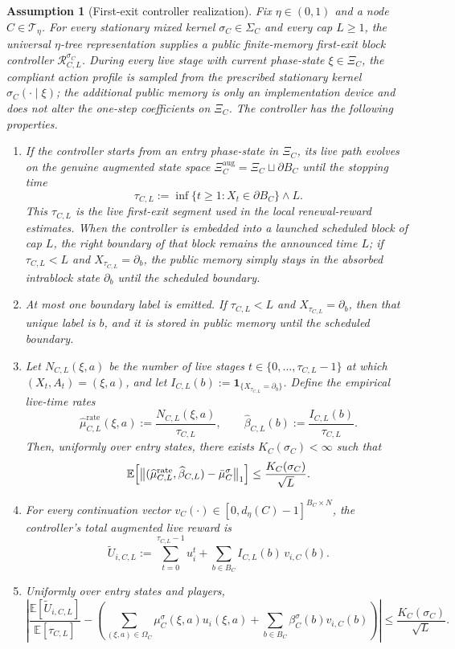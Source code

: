 \documentclass[12pt]{article}
\newtheorem{assumption}[theorem]{Assumption}
\theoremstyle{definition}
\newcommand{\E}{\mathbb{E}}
\newcommand{\1}{\mathbf{1}}
\newcommand{\cT}{\mathcal{T}}
\begin{document}
\begin{assumption}[First-exit controller realization]
\label{ass:controller-input}
Fix $\eta\in(0,1)$ and a node $C\in\cT_\eta$. For every stationary mixed kernel
$\sigma_C\in\Sigma_C$ and every cap $L\ge 1$, the universal
$\eta$-tree representation supplies a public finite-memory first-exit block
controller $\mathcal R_{C,L}^{\sigma_C}$. During every live stage with current
phase-state $\xi\in\Xi_C$, the compliant action profile is sampled from the
prescribed stationary kernel $\sigma_C(\cdot\mid\xi)$; the additional public
memory is only an implementation device and does not alter the one-step
coefficients on $\Xi_C$. The controller has the following properties.
\begin{enumerate}[label=\textnormal{(R\arabic*)},leftmargin=2.8em]
\item If the controller starts from an entry phase-state in $\Xi_C$, its live
path evolves on the genuine augmented state space
$\Xi_C^{\mathrm{aug}}=\Xi_C\sqcup\partial B_C$ until the stopping time
\[
\tau_{C,L}
:=
\inf\{t\ge 1:X_t\in\partial B_C\}\wedge L.
\]
This $\tau_{C,L}$ is the live first-exit segment used in the local
renewal-reward estimates. When the controller is embedded into a launched
scheduled block of cap $L$, the right boundary of that block remains the
announced time $L$; if $\tau_{C,L}<L$ and $X_{\tau_{C,L}}=\partial_b$, the public
memory simply stays in the absorbed intrablock state $\partial_b$ until the
scheduled boundary.
\item At most one boundary label is emitted. If $\tau_{C,L}<L$ and
$X_{\tau_{C,L}}=\partial_b$, then that unique label is $b$, and it is stored in
public memory until the scheduled boundary.
\item Let $N_{C,L}(\xi,a)$ be the number of live stages
$t\in\{0,\dots,\tau_{C,L}-1\}$ at which $(X_t,A_t)=(\xi,a)$, and let
$I_{C,L}(b):=\1_{\{X_{\tau_{C,L}}=\partial_b\}}$. Define the empirical live-time
rates
\[
\widehat\mu_{C,L}^{\mathrm{rate}}(\xi,a):=\frac{N_{C,L}(\xi,a)}{\tau_{C,L}},
\qquad
\widehat\beta_{C,L}(b):=\frac{I_{C,L}(b)}{\tau_{C,L}}.
\]
Then, uniformly over entry states, there exists $K_C(\sigma_C)<\infty$ such that
\begin{equation}
\label{eq:controller-input-occ}
\E\Bigl[
\bigl\|(\widehat\mu_{C,L}^{\mathrm{rate}},\widehat\beta_{C,L})
-
\bar\mu_C^\sigma
\bigr\|_1
\Bigr]
\le \frac{K_C(\sigma_C)}{\sqrt L}.
\end{equation}
\item For every continuation vector
$v_C(\cdot)\in[0,d_\eta(C)-1]^{B_C\times N}$, the controller's total augmented
live reward is
\[
\widetilde U_{i,C,L}
:=
\sum_{t=0}^{\tau_{C,L}-1} u_i^t
+
\sum_{b\in B_C}I_{C,L}(b)\,v_{i,C}(b).
\]
\item Uniformly over entry states and players,
\begin{equation}
\label{eq:controller-input-renewal}
\left|
\frac{\E[\widetilde U_{i,C,L}]}{\E[\tau_{C,L}]}
-
\left(
\sum_{(\xi,a)\in\Omega_C}\mu_C^\sigma(\xi,a)u_i(\xi,a)
+
\sum_{b\in B_C}\beta_C^\sigma(b)v_{i,C}(b)
\right)
\right|
\le \frac{K_C(\sigma_C)}{\sqrt L}.
\end{equation}
\end{enumerate}
\end{assumption}
\end{document}
